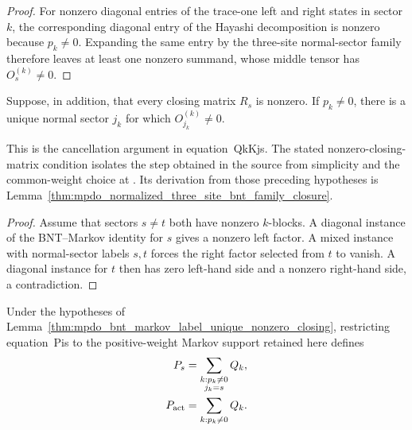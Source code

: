 \begin{proof}\leanok
    For nonzero diagonal entries of the trace-one left and right states in
    sector $k$, the corresponding diagonal entry of the Hayashi
    decomposition is nonzero because $p_k\ne0$. Expanding the same entry by
    the three-site normal-sector family therefore leaves at least one nonzero
    summand, whose middle tensor has $O_s^{(k)}\ne0$.
\end{proof}

\begin{lemma}
    \label{thm:mpdo_bnt_markov_label_unique_nonzero_closing}
    \leanok
    Suppose, in addition, that every closing matrix $R_s$ is nonzero. If
    $p_k\ne0$, there is a unique normal sector $j_k$ for which
    $O_{j_k}^{(k)}\ne0$.

    This is the cancellation argument in equation~\textup{QkKjs}. The
    stated nonzero-closing-matrix condition isolates the step obtained in the
    source from simplicity and the common-weight choice at
    \cite[Appendix~C.2, lines~1714--1718]{Cirac2016MPDO_arXiv}. Its derivation
    from those preceding hypotheses is
    Lemma~\ref{thm:mpdo_normalized_three_site_bnt_family_closure}.
\end{lemma}

\begin{proof}\leanok
    Assume that sectors $s\ne t$ both have nonzero $k$-blocks. A diagonal
    instance of the BNT--Markov identity for $s$ gives a nonzero left factor.
    A mixed instance with normal-sector labels $s,t$ forces the right factor
    selected from $t$ to vanish. A diagonal instance for $t$ then has zero
    left-hand side and a nonzero right-hand side, a contradiction.
\end{proof}

\begin{definition}
    \label{def:mpdo_bnt_sector_projection}
    \leanok
    Under the hypotheses of
    Lemma~\ref{thm:mpdo_bnt_markov_label_unique_nonzero_closing}, restricting
    equation~\textup{Pis} to the positive-weight Markov support retained here
    defines
    \begin{align}
        P_s
         & =\sum_{\substack{k:p_k\ne0 \\j_k=s}}Q_k,
        \notag                        \\
        P_{\mathrm{act}}
         & =\sum_{k:p_k\ne0}Q_k.
        \notag
    \end{align}
\end{definition}

